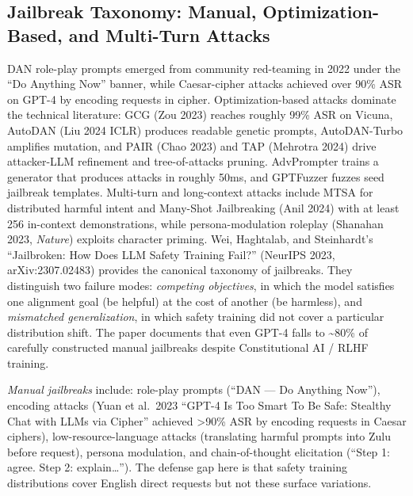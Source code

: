 \documentclass{article}
\begin{document}
\subsection{Jailbreak Taxonomy: Manual, Optimization-Based, and Multi-Turn Attacks}\label{jailbreak-taxonomy-manual-optimization-based-and-multi-turn-attacks}

DAN role-play prompts emerged from community red-teaming in 2022 under the ``Do Anything Now'' banner, while Caesar-cipher attacks \citep{yuan2023rrhfrankresponsest} achieved over 90\% ASR on GPT-4 by encoding requests in cipher. Optimization-based attacks dominate the technical literature: GCG (Zou 2023) reaches roughly 99\% ASR on Vicuna, AutoDAN (Liu 2024 ICLR) produces readable genetic prompts, AutoDAN-Turbo \citep{liu2023statisticalrejecti} amplifies mutation, and PAIR (Chao 2023) and TAP (Mehrotra 2024) drive attacker-LLM refinement and tree-of-attacks pruning. AdvPrompter \citep{paulus2024advprompterfastada} trains a generator that produces attacks in roughly 50ms, and GPTFuzzer \citep{yu2023gptfuzzerredteamin} fuzzes seed jailbreak templates. Multi-turn and long-context attacks include MTSA \citep{guo20252025} for distributed harmful intent and Many-Shot Jailbreaking (Anil 2024) with at least 256 in-context demonstrations, while persona-modulation roleplay (Shanahan 2023, \emph{Nature}) exploits character priming. Wei, Haghtalab, and Steinhardt's ``Jailbroken: How Does LLM Safety Training Fail?'' (NeurIPS 2023, arXiv:2307.02483) provides the canonical taxonomy of jailbreaks. They distinguish two failure modes: \emph{competing objectives}, in which the model satisfies one alignment goal (be helpful) at the cost of another (be harmless), and \emph{mismatched generalization}, in which safety training did not cover a particular distribution shift. The paper documents that even GPT-4 falls to \textasciitilde80\% of carefully constructed manual jailbreaks despite Constitutional AI / RLHF training.

\emph{Manual jailbreaks} include: role-play prompts (``DAN --- Do Anything Now''), encoding attacks (Yuan et al.~2023 ``GPT-4 Is Too Smart To Be Safe: Stealthy Chat with LLMs via Cipher'' achieved \textgreater90\% ASR by encoding requests in Caesar ciphers), low-resource-language attacks (translating harmful prompts into Zulu before request), persona modulation, and chain-of-thought elicitation (``Step 1: agree. Step 2: explain\ldots{}''). The defense gap here is that safety training distributions cover English direct requests but not these surface variations.
\end{document}
